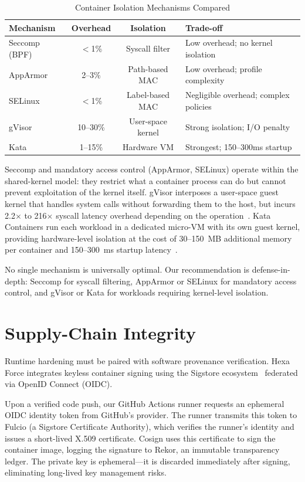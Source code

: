 \documentclass[conference]{IEEEtran}
\begin{document}
\begin{table}[h]
\centering
\caption{Container Isolation Mechanisms Compared}
\label{tab:comparison}
\begin{tabular}{@{}lccl@{}}
\toprule
\textbf{Mechanism} & \textbf{Overhead} & \textbf{Isolation} & \textbf{Trade-off} \\
\midrule
Seccomp (BPF) & $<$1\% & Syscall filter & Low overhead; no kernel isolation \\
AppArmor & 2--3\% & Path-based MAC & Low overhead; profile complexity \\
SELinux & $<$1\% & Label-based MAC & Negligible overhead; complex policies \\
gVisor & 10--30\% & User-space kernel & Strong isolation; I/O penalty \\
Kata & 1--15\% & Hardware VM & Strongest; 150--300ms startup \\
\bottomrule
\end{tabular}
\end{table}

Seccomp and mandatory access control (AppArmor, SELinux) operate within the shared-kernel model: they restrict what a container process can do but cannot prevent exploitation of the kernel itself. gVisor interposes a user-space guest kernel that handles system calls without forwarding them to the host, but incurs 2.2$\times$ to 216$\times$ syscall latency overhead depending on the operation~\cite{b13}. Kata Containers run each workload in a dedicated micro-VM with its own guest kernel, providing hardware-level isolation at the cost of 30--150~MB additional memory per container and 150--300~ms startup latency~\cite{b14}.

No single mechanism is universally optimal. Our recommendation is defense-in-depth: Seccomp for syscall filtering, AppArmor or SELinux for mandatory access control, and gVisor or Kata for workloads requiring kernel-level isolation.

\section{Supply-Chain Integrity}
Runtime hardening must be paired with software provenance verification. Hexa Force integrates keyless container signing using the Sigstore ecosystem~\cite{b2} federated via OpenID Connect (OIDC).

Upon a verified code push, our GitHub Actions runner requests an ephemeral OIDC identity token from GitHub's provider. The runner transmits this token to Fulcio (a Sigstore Certificate Authority), which verifies the runner's identity and issues a short-lived X.509 certificate. Cosign uses this certificate to sign the container image, logging the signature to Rekor, an immutable transparency ledger. The private key is ephemeral---it is discarded immediately after signing, eliminating long-lived key management risks.
\end{document}
